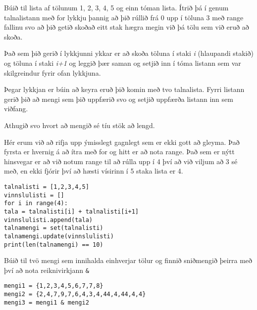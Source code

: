 \begin{exercise}\label{set3}
Búið til lista af tölunum 1, 2, 3, 4, 5 og einn tóman lista.
Ítrið þá í genum talnalistann með for lykkju þannig að þið rúllið frá 0 upp í töluna 3 með range fallinu svo að þið getið skoðað eitt stak hægra megin við þá tölu sem við eruð að skoða.

Það sem þið gerið í lykkjunni ykkar er að skoða töluna í staki \textit{i} (hlaupandi stakið) og töluna í staki \textit{i+1} og leggið þær saman og setjið inn í tóma listann sem var skilgreindur fyrir ofan lykkjuna.

Þegar lykkjan er búin að keyra eruð þið komin með tvo talnalista.
Fyrri listann gerið þið að mengi sem þið uppfærið svo og setjið uppfærða listann inn sem viðfang.

Athugið svo hvort að mengið sé tíu stök að lengd.
\end{exercise}
\begin{Answer}[ref={set3}]
Hér erum við að rifja upp ýmisslegt gagnlegt sem er ekki gott að gleyma.
Það fyrsta er hvernig á að ítra með for og hitt er að nota range.
Það sem er nýtt hinsvegar er að við notum range til að rúlla upp í 4 því að við viljum að 3 sé með, en ekki fjórir því að hæsti vísirinn í 5 staka lista er 4.

	\begin{lstlisting}
talnalisti = [1,2,3,4,5]
vinnslulisti = []
for i in range(4):
tala = talnalisti[i] + talnalisti[i+1]
vinnslulisti.append(tala)
talnamengi = set(talnalisti)
talnamengi.update(vinnslulisti)
print(len(talnamengi) == 10)\end{lstlisting}
\end{Answer}

\begin{exercise}\label{set4}
Búið til tvö mengi sem innihalda einhverjar tölur og finnið sniðmengið þeirra með því að nota reiknivirkjann \texttt{\&}
\end{exercise}
\begin{Answer}[ref={set4}]
\begin{lstlisting}
mengi1 = {1,2,3,4,5,6,7,7,8}
mengi2 = {2,4,7,9,7,6,4,3,4,44,4,44,4,4}
mengi3 = mengi1 & mengi2\end{lstlisting}
\end{Answer}